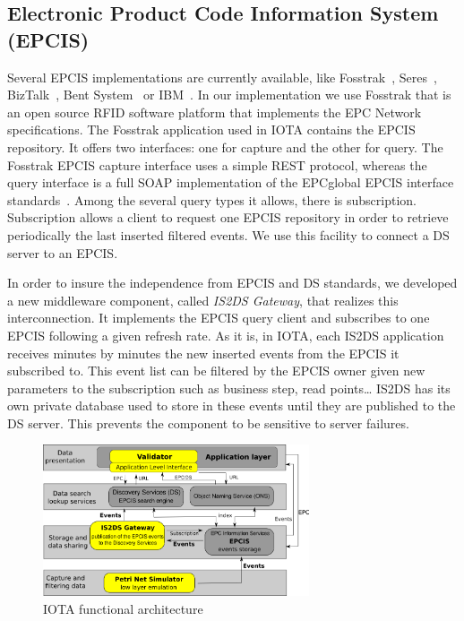 \documentclass[a4paper]{llncs}
\begin{document}
\subsection{Electronic Product Code Information System (EPCIS)}
\label{subsec:EPCIS}

Several EPCIS implementations are currently available, like Fosstrak~\cite{fosstrak},
Seres~\cite{seres}, BizTalk~\cite{bizTalk}, Bent System~\cite{bent} or IBM~\cite{IBM}. In our
implementation we use Fosstrak that is an open source RFID software platform
that implements the EPC Network specifications. The Fosstrak application used
in IOTA contains the EPCIS repository. It offers two interfaces: one for capture and the other for
query. The Fosstrak EPCIS capture interface uses a simple REST protocol, whereas the
query interface is a full SOAP implementation of the EPCglobal EPCIS
interface standards~\cite{epcis}. Among the several query types it allows, there is subscription.
Subscription allows a client to request one EPCIS repository in order to
retrieve periodically the last inserted filtered events. We use this facility
to connect a DS server to an EPCIS.

In order to insure the independence from EPCIS and DS standards, we developed a
new middleware component, called \emph{IS2DS Gateway}, that realizes this
interconnection. 
It implements the EPCIS query client and subscribes to one EPCIS following a
given refresh rate. As it is, in IOTA, each IS2DS application receives minutes by
minutes the new inserted events from the EPCIS it subscribed to. This event
list can be filtered by the EPCIS owner given new parameters to the
subscription such as business step, read points\ldots{} IS2DS has its own
private database used to store in these events until they are published to the
DS server. This prevents the component to be sensitive to server failures.

\begin{figure}[htb]
\centering
\includegraphics[width=0.7\textwidth]{iota_visuel/iota_archi_funct_grise.png}

\caption{IOTA functional architecture}
\label{archi}
\end{figure}
\end{document}
